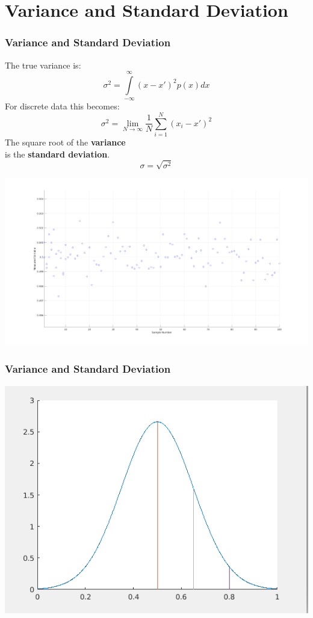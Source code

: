 \documentclass[fleqn]{beamer} %
\newcommand{\sectiontitleII}{Variance and Standard Deviation}
\begin{document}
\section{\sectiontitleII}	
	\begin{frame}[label=sectionII] \small
		\frametitle{\sectiontitleII}    
		
		\begin{multicols}{2} \tiny
		The true variance is:\\
		\[ \sigma^2=\int\limits_{-\infty}^{\infty}(x-x')^2p(x)dx \]
		For discrete data this becomes:\\
		\[ \sigma^2=\lim\limits_{N\rightarrow \infty}\frac{1}{N}\sum\limits_{i=1}^{N}(x_i-x')^2 \]
		The square root of the {\bf \B variance} \\
		is the {\bf \PR standard deviation}. \\
		\[\sigma=\sqrt{\sigma^2}\]

		\hspace*{-1.5cm}\includegraphics[scale=.20]{topic2_measured_fig2.png}		
		
		\end{multicols}


	\end{frame}
	
	\begin{frame} \small
		\frametitle{\sectiontitleII}    

		\includegraphics[scale=.50]{lecture1_fig1.png}		
		
	\end{frame}
	
\end{document}
